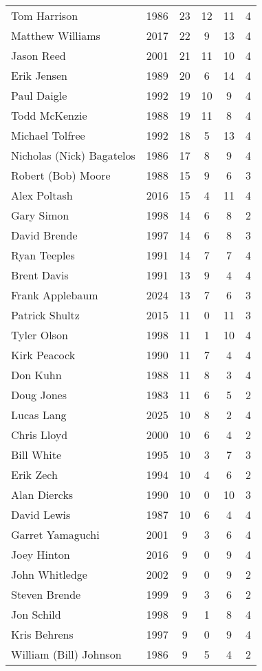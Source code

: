 \begin{longtable}{lccccc}
Tom Harrison & 1986 & 23 & 12 & 11 & 4 \\
Matthew Williams & 2017 & 22 & 9 & 13 & 4 \\
Jason Reed & 2001 & 21 & 11 & 10 & 4 \\
Erik Jensen & 1989 & 20 & 6 & 14 & 4 \\
Paul Daigle & 1992 & 19 & 10 & 9 & 4 \\
Todd McKenzie & 1988 & 19 & 11 & 8 & 4 \\
Michael Tolfree & 1992 & 18 & 5 & 13 & 4 \\
Nicholas (Nick) Bagatelos & 1986 & 17 & 8 & 9 & 4 \\
Robert (Bob) Moore & 1988 & 15 & 9 & 6 & 3 \\
Alex Poltash & 2016 & 15 & 4 & 11 & 4 \\
Gary Simon & 1998 & 14 & 6 & 8 & 2 \\
David Brende & 1997 & 14 & 6 & 8 & 3 \\
Ryan Teeples & 1991 & 14 & 7 & 7 & 4 \\
Brent Davis & 1991 & 13 & 9 & 4 & 4 \\
Frank Applebaum & 2024 & 13 & 7 & 6 & 3 \\
Patrick Shultz & 2015 & 11 & 0 & 11 & 3 \\
Tyler Olson & 1998 & 11 & 1 & 10 & 4 \\
Kirk Peacock & 1990 & 11 & 7 & 4 & 4 \\
Don Kuhn & 1988 & 11 & 8 & 3 & 4 \\
Doug Jones & 1983 & 11 & 6 & 5 & 2 \\
Lucas Lang & 2025 & 10 & 8 & 2 & 4 \\
Chris Lloyd & 2000 & 10 & 6 & 4 & 2 \\
Bill White & 1995 & 10 & 3 & 7 & 3 \\
Erik Zech & 1994 & 10 & 4 & 6 & 2 \\
Alan Diercks & 1990 & 10 & 0 & 10 & 3 \\
David Lewis & 1987 & 10 & 6 & 4 & 4 \\
Garret Yamaguchi & 2001 & 9 & 3 & 6 & 4 \\
Joey Hinton & 2016 & 9 & 0 & 9 & 4 \\
John Whitledge & 2002 & 9 & 0 & 9 & 2 \\
Steven Brende & 1999 & 9 & 3 & 6 & 2 \\
Jon Schild & 1998 & 9 & 1 & 8 & 4 \\
Kris Behrens & 1997 & 9 & 0 & 9 & 4 \\
William (Bill) Johnson & 1986 & 9 & 5 & 4 & 2 \\

\end{longtable}
